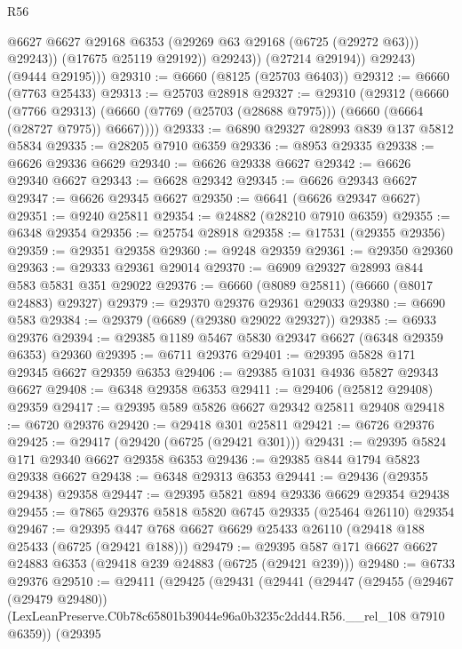 \begin{lexlean}{R56}
\begin{coremodule}
                      @6627
                      @6627
                      @29168
                      @6353
                      (@29269 @63 @29168 (@6725 (@29272 @63)))
                      @29243))
                  (@17675 @25119 @29192))
                @29243))
            (@27214 @29194))
          @29243)
        (@9444 @29195)))
@29310 := @6660 (@8125 (@25703 @6403))
@29312 := @6660 (@7763 @25433)
@29313 := @25703 @28918
@29327 := @29310
    (@29312
      (@6660
        (@7766 @29313)
        (@6660 (@7769 (@25703 (@28688 @7975))) (@6660 (@6664 (@28727 @7975)) @6667))))
@29333 := @6890 @29327 @28993 @839 @137 @5812 @5834
@29335 := @28205 @7910 @6359
@29336 := @8953 @29335
@29338 := @6626 @29336 @6629
@29340 := @6626 @29338 @6627
@29342 := @6626 @29340 @6627
@29343 := @6628 @29342
@29345 := @6626 @29343 @6627
@29347 := @6626 @29345 @6627
@29350 := @6641 (@6626 @29347 @6627)
@29351 := @9240 @25811
@29354 := @24882 (@28210 @7910 @6359)
@29355 := @6348 @29354
@29356 := @25754 @28918
@29358 := @17531 (@29355 @29356)
@29359 := @29351 @29358
@29360 := @9248 @29359
@29361 := @29350 @29360
@29363 := @29333 @29361 @29014
@29370 := @6909 @29327 @28993 @844 @583 @5831 @351 @29022
@29376 := @6660 (@8089 @25811) (@6660 (@8017 @24883) @29327)
@29379 := @29370 @29376 @29361 @29033
@29380 := @6690 @583
@29384 := @29379 (@6689 (@29380 @29022 @29327))
@29385 := @6933 @29376
@29394 := @29385 @1189 @5467 @5830 @29347 @6627 (@6348 @29359 @6353) @29360
@29395 := @6711 @29376
@29401 := @29395 @5828 @171 @29345 @6627 @29359 @6353
@29406 := @29385 @1031 @4936 @5827 @29343 @6627
@29408 := @6348 @29358 @6353
@29411 := @29406 (@25812 @29408) @29359
@29417 := @29395 @589 @5826 @6627 @29342 @25811 @29408
@29418 := @6720 @29376
@29420 := @29418 @301 @25811
@29421 := @6726 @29376
@29425 := @29417 (@29420 (@6725 (@29421 @301)))
@29431 := @29395 @5824 @171 @29340 @6627 @29358 @6353
@29436 := @29385 @844 @1794 @5823 @29338 @6627
@29438 := @6348 @29313 @6353
@29441 := @29436 (@29355 @29438) @29358
@29447 := @29395 @5821 @894 @29336 @6629 @29354 @29438
@29455 := @7865 @29376 @5818 @5820 @6745 @29335 (@25464 @26110) @29354
@29467 := @29395 @447 @768 @6627 @6629 @25433 @26110 (@29418 @188 @25433 (@6725 (@29421 @188)))
@29479 := @29395 @587 @171 @6627 @6627 @24883 @6353 (@29418 @239 @24883 (@6725 (@29421 @239)))
@29480 := @6733 @29376
@29510 := @29411
    (@29425
      (@29431
        (@29441
          (@29447
            (@29455
              (@29467 (@29479 @29480))
              (LexLeanPreserve.C0b78c65801b39044e96a0b3235c2dd44.R56.__rel_108 @7910 @6359))
            (@29395

\end{coremodule}
\end{lexlean}

